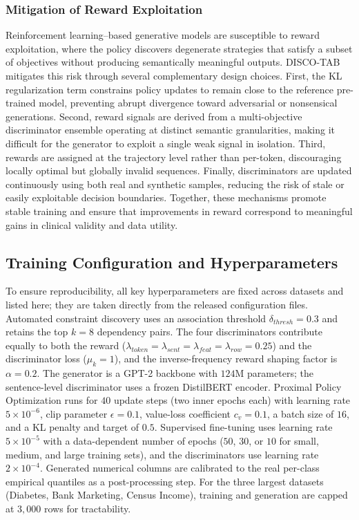 \subsubsection{Mitigation of Reward Exploitation}
Reinforcement learning–based generative models are susceptible to reward exploitation, where the policy discovers degenerate strategies that satisfy a subset of objectives without producing semantically meaningful outputs. DISCO-TAB mitigates this risk through several complementary design choices. First, the KL regularization term constrains policy updates to remain close to the reference pre-trained model, preventing abrupt divergence toward adversarial or nonsensical generations. Second, reward signals are derived from a multi-objective discriminator ensemble operating at distinct semantic granularities, making it difficult for the generator to exploit a single weak signal in isolation. Third, rewards are assigned at the trajectory level rather than per-token, discouraging locally optimal but globally invalid sequences. Finally, discriminators are updated continuously using both real and synthetic samples, reducing the risk of stale or easily exploitable decision boundaries. Together, these mechanisms promote stable training and ensure that improvements in reward correspond to meaningful gains in clinical validity and data utility.


\subsection{Training Configuration and Hyperparameters}
To ensure reproducibility, all key hyperparameters are fixed across datasets and listed here; they are taken directly from the released configuration files. Automated constraint discovery uses an association threshold $\delta_{thresh}=0.3$ and retains the top $k=8$ dependency pairs. The four discriminators contribute equally to both the reward ($\lambda_{token}=\lambda_{sent}=\lambda_{feat}=\lambda_{row}=0.25$) and the discriminator loss ($\mu_k=1$), and the inverse-frequency reward shaping factor is $\alpha=0.2$. The generator is a GPT-2 backbone with $124$M parameters; the sentence-level discriminator uses a frozen DistilBERT encoder. Proximal Policy Optimization runs for $40$ update steps (two inner epochs each) with learning rate $5\times10^{-6}$, clip parameter $\epsilon=0.1$, value-loss coefficient $c_v=0.1$, a batch size of $16$, and a KL penalty and target of $0.5$. Supervised fine-tuning uses learning rate $5\times10^{-5}$ with a data-dependent number of epochs ($50$, $30$, or $10$ for small, medium, and large training sets), and the discriminators use learning rate $2\times10^{-4}$. Generated numerical columns are calibrated to the real per-class empirical quantiles as a post-processing step. For the three largest datasets (Diabetes, Bank Marketing, Census Income), training and generation are capped at $3{,}000$ rows for tractability.
